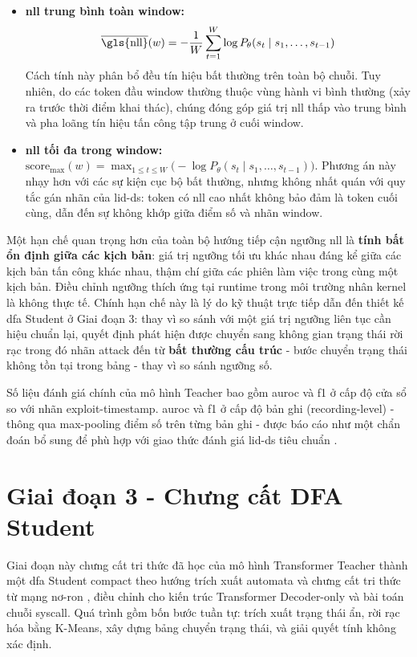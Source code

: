 \documentclass[../main.tex]{subfiles}
\begin{document}
\begin{itemize}
  \item \textbf{\gls{nll} trung bình toàn window:}
    \[
      \overline{\text{\gls{nll}}}(w) = -\frac{1}{W}\sum_{t=1}^{W}
      \log P_\theta(s_t \mid s_1, \ldots, s_{t-1})
    \]
    Cách tính này phân bổ đều tín hiệu bất thường trên toàn bộ chuỗi.
    Tuy nhiên, do
    các token đầu window thường thuộc vùng hành vi bình thường (xảy
      ra trước thời điểm
    khai thác), chúng đóng góp giá trị \gls{nll} thấp vào trung bình và pha
    loãng tín hiệu
    tấn công tập trung ở cuối window.
  \item \textbf{\gls{nll} tối đa trong window:}
    $\text{score}_{\max}(w) = \max_{1 \leq t \leq W}\bigl(-\log
      P_\theta(s_t \mid
    s_1, \ldots, s_{t-1})\bigr)$.
    Phương án này nhạy hơn với các sự kiện cục bộ bất thường, nhưng
    không nhất quán
    với quy tắc gán nhãn của \gls{lid-ds}: token có \gls{nll} cao nhất không bảo
    đảm là token cuối
    cùng, dẫn đến sự không khớp giữa điểm số và nhãn window.
\end{itemize}

Một hạn chế quan trọng hơn của toàn bộ hướng tiếp cận ngưỡng \gls{nll} là
\textbf{tính bất
ổn định giữa các kịch bản}: giá trị ngưỡng tối ưu khác nhau đáng kể
giữa các kịch bản
tấn công khác nhau, thậm chí giữa các phiên làm việc trong cùng một
kịch bản. Điều
chỉnh ngưỡng thích ứng tại runtime trong môi trường nhân kernel là
không thực tế. Chính
hạn chế này là lý do kỹ thuật trực tiếp dẫn đến thiết kế \gls{dfa} Student
ở Giai đoạn 3:
thay vì so sánh với một giá trị ngưỡng liên tục cần hiệu chuẩn lại,
quyết định phát
hiện được chuyển sang không gian trạng thái rời rạc trong đó nhãn attack đến từ
\textbf{bất thường cấu trúc} - bước chuyển trạng thái không tồn tại
trong bảng - thay
vì so sánh ngưỡng số.

Số liệu đánh giá chính của mô hình Teacher bao gồm \gls{auroc} và \gls{f1} ở cấp
độ cửa sổ so với
nhãn exploit-timestamp. \Gls{auroc} và \gls{f1} ở cấp độ bản ghi
(recording-level) - thông qua
max-pooling điểm số trên từng bản ghi - được báo cáo như một chẩn
đoán bổ sung để phù
hợp với giao thức đánh giá \gls{lid-ds} tiêu chuẩn \cite{grimmer2022dataset}.

\section{Giai đoạn 3 - Chưng cất DFA Student}
\label{sec:phase3}

Giai đoạn này chưng cất tri thức đã học của mô hình Transformer
Teacher thành một \gls{dfa}
Student compact theo hướng trích xuất automata và chưng cất tri thức
từ mạng nơ-ron
\cite{ables2024eclectic,herbinger2023leveraging,friedman2023learning},
điều chỉnh cho
kiến trúc Transformer Decoder-only và bài toán chuỗi \gls{syscall}. Quá
trình gồm bốn bước tuần tự: trích xuất
trạng thái ẩn, rời rạc hóa bằng K-Means, xây dựng bảng chuyển trạng
thái, và giải quyết
tính không xác định.
\end{document}
